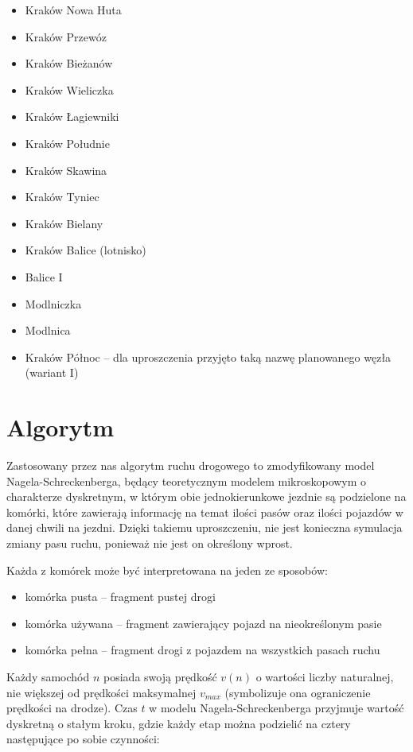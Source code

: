 \documentclass[a4paper,12pt]{article}
\begin{document}
	\begin{itemize}
		\item Kraków Nowa Huta
		\item Kraków Przewóz
		\item Kraków Bieżanów
		\item Kraków Wieliczka
		\item Kraków Łagiewniki
		\item Kraków Południe
		\item Kraków Skawina
		\item Kraków Tyniec
		\item Kraków Bielany
		\item Kraków Balice (lotnisko)
		\item Balice I
		\item Modlniczka
		\item Modlnica
		\item Kraków Północ -- dla uproszczenia przyjęto taką nazwę planowanego węzła (wariant I)
	\end{itemize}

    \section{Algorytm}
    Zastosowany przez nas algorytm ruchu drogowego to zmodyfikowany model Nagela-Schreckenberga, będący teoretycznym modelem mikroskopowym o charakterze dyskretnym, w którym obie jednokierunkowe jezdnie są podzielone na komórki, które zawierają informację na temat ilości pasów oraz ilości pojazdów w danej chwili na jezdni. Dzięki takiemu uproszczeniu, nie jest konieczna symulacja zmiany pasu ruchu, ponieważ nie jest on określony wprost.
    
    Każda z komórek może być interpretowana na jeden ze sposobów:
    
    \begin{itemize}
    	\item komórka pusta -- fragment pustej drogi
    	\item komórka używana -- fragment zawierający pojazd na nieokreślonym pasie
    	\item komórka pełna -- fragment drogi z pojazdem na wszystkich pasach ruchu
    \end{itemize}

	Każdy samochód $n$ posiada swoją prędkość $v(n)$ o wartości liczby naturalnej, nie większej od prędkości maksymalnej $v_{max}$ (symbolizuje ona ograniczenie prędkości na drodze).
	Czas $t$ w modelu Nagela-Schreckenberga przyjmuje wartość dyskretną o stałym kroku, gdzie każdy etap można podzielić na cztery następujące po sobie czynności:
\end{document}
